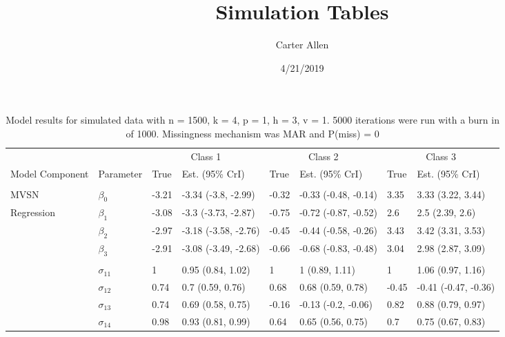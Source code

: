 \documentclass[]{article}
\title{Simulation Tables}
\author{Carter Allen}
\date{4/21/2019}
\begin{document}
\maketitle

\begin{table}[t]

\caption{\label{tab:unnamed-chunk-4}Model results for simulated data with n = 1500, k = 4, p = 1, h = 3, v = 1. 5000 iterations were run with a burn in of 1000. Missingness mechanism was MAR and P(miss) = 0}
\centering
\fontsize{8}{10}\selectfont
\begin{tabular}{llllllll}
\toprule
\multicolumn{2}{c}{ } & \multicolumn{2}{c}{Class 1} & \multicolumn{2}{c}{Class 2} & \multicolumn{2}{c}{Class 3} \\
\cmidrule(l{3pt}r{3pt}){3-4} \cmidrule(l{3pt}r{3pt}){5-6} \cmidrule(l{3pt}r{3pt}){7-8}
Model Component & Parameter & True & Est. (95\% CrI) & True & Est. (95\% CrI) & True & Est. (95\% CrI)\\
\midrule
\addlinespace[0.3em]
\multicolumn{8}{l}{\textbf{ }}\\
\hspace{1em}MVSN & $\beta_{0}$ & -3.21 & -3.34 (-3.8, -2.99) & -0.32 & -0.33 (-0.48, -0.14) & 3.35 & 3.33 (3.22, 3.44)\\
\hspace{1em}Regression & $\beta_{1}$ & -3.08 & -3.3 (-3.73, -2.87) & -0.75 & -0.72 (-0.87, -0.52) & 2.6 & 2.5 (2.39, 2.6)\\
\hspace{1em} & $\beta_{2}$ & -2.97 & -3.18 (-3.58, -2.76) & -0.45 & -0.44 (-0.58, -0.26) & 3.43 & 3.42 (3.31, 3.53)\\
\hspace{1em} & $\beta_{3}$ & -2.91 & -3.08 (-3.49, -2.68) & -0.66 & -0.68 (-0.83, -0.48) & 3.04 & 2.98 (2.87, 3.09)\\
\addlinespace[0.3em]
\multicolumn{8}{l}{\textbf{ }}\\
\hspace{1em} & $\sigma_{11}$ & 1 & 0.95 (0.84, 1.02) & 1 & 1 (0.89, 1.11) & 1 & 1.06 (0.97, 1.16)\\
\hspace{1em} & $\sigma_{12}$ & 0.74 & 0.7 (0.59, 0.76) & 0.68 & 0.68 (0.59, 0.78) & -0.45 & -0.41 (-0.47, -0.36)\\
\hspace{1em} & $\sigma_{13}$ & 0.74 & 0.69 (0.58, 0.75) & -0.16 & -0.13 (-0.2, -0.06) & 0.82 & 0.88 (0.79, 0.97)\\
\hspace{1em} & $\sigma_{14}$ & 0.98 & 0.93 (0.81, 0.99) & 0.64 & 0.65 (0.56, 0.75) & 0.7 & 0.75 (0.67, 0.83)\\

\end{tabular}
\end{table}
\end{document}
